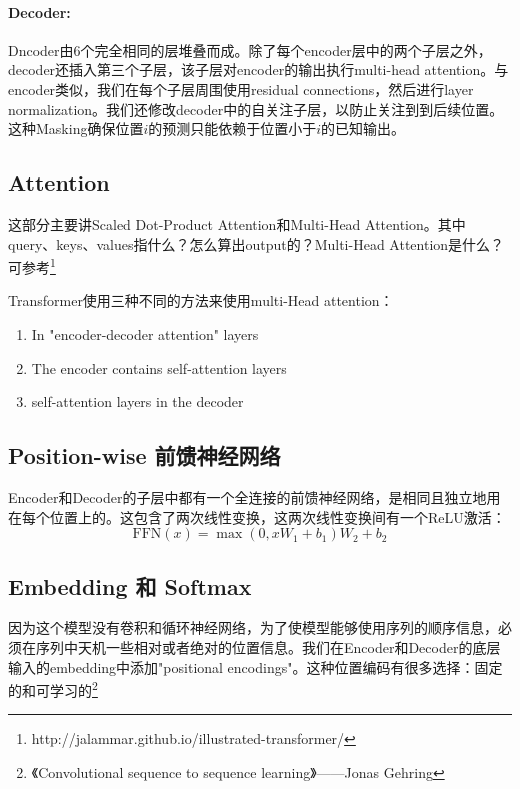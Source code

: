 \documentclass[a4paper,UTF8,no-math]{ctexart}
\begin{document}
	\paragraph{Decoder:}Dncoder由6个完全相同的层堆叠而成。除了每个encoder层中的两个子层之外，decoder还插入第三个子层，该子层对encoder的输出执行multi-head attention。与encoder类似，我们在每个子层周围使用residual connections，然后进行layer normalization。我们还修改decoder中的自关注子层，以防止关注到到后续位置。这种Masking确保位置$i$的预测只能依赖于位置小于$i$的已知输出。
	
	\subsection{Attention}
	
	这部分主要讲Scaled Dot-Product Attention和Multi-Head Attention。其中 query、keys、values指什么？怎么算出output的？Multi-Head Attention是什么？可参考\footnote{http://jalammar.github.io/illustrated-transformer/}
	
	Transformer使用三种不同的方法来使用multi-Head attention：
	\begin{enumerate}
		\item In "encoder-decoder attention" layers
		\item The encoder contains self-attention layers
		\item  self-attention layers in the decoder
	\end{enumerate}

	\subsection{Position-wise 前馈神经网络}
	
	Encoder和Decoder的子层中都有一个全连接的前馈神经网络，是相同且独立地用在每个位置上的。这包含了两次线性变换，这两次线性变换间有一个ReLU激活：
	\begin{equation}
	\mathrm{FFN}(x)=\max(0, xW_1 + b_1) W_2 + b_2
	\end{equation}
	
	\subsection{Embedding 和 Softmax}
	
	因为这个模型没有卷积和循环神经网络，为了使模型能够使用序列的顺序信息，必须在序列中天机一些相对或者绝对的位置信息。我们在Encoder和Decoder的底层输入的embedding中添加"positional encodings"。这种位置编码有很多选择：固定的和可学习的\footnote{《Convolutional sequence to sequence learning》——Jonas Gehring}
	
\end{document}
